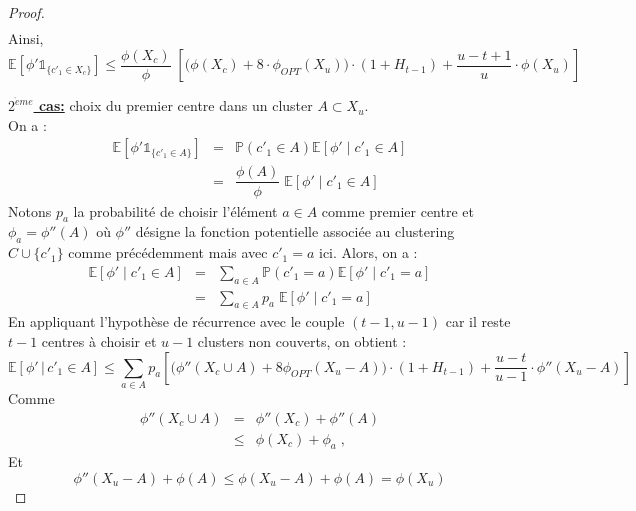 \documentclass[12pt,a4paper]{book}
\newcommand{\E}{\mathbb{E}}
\newcommand{\p}{\mathbb{P}}
\newcommand{\1}{\mathds{1}}
\begin{document}
\begin{proof}
\begin{eqnarray*}
		  \end{eqnarray*}
		  Ainsi,
		  $$
		  	\E\left[\phi' \1_{\{c'_1 \in X_c\}} \right] \leq \dfrac{\phi \left( X_c \right)}{\phi} \; \left[ \bigg( \phi \left( X_c \right) + 8 \cdot \phi_{OPT} \left( X_u \right) \bigg) \cdot \left( 1 + H_{t-1} \right) + \frac{u-t+1}{u} \cdot \phi \left( X_u \right) \right]
		  $$
		  \item \underline{\textbf{$2^{\grave{e}me}$ cas:}} choix du premier centre dans un cluster $A \subset X_u$.\\
		  On a :
		  \begin{eqnarray*}
		  	\E\left[\phi' \1_{\{c'_1 \in A\}} \right] &=& \p \left( c'_1 \in A \right)\E\left[\phi' \; | \; c'_1 \in A \right]\\
		  	&=&  \dfrac{\phi \left( A \right)}{\phi} \; \E\left[\phi' \; | \; c'_1 \in A \right]
		  \end{eqnarray*}
		  Notons $p_a$ la probabilité de choisir l'élément $a \in A$ comme premier centre et $\phi_a = \phi''(A)$ où $\phi''$ désigne la fonction potentielle associée au clustering $C \cup \{ c'_1 \}$ comme précédemment mais avec $c'_1=a$ ici. Alors, on a : 
		  \begin{eqnarray*}
		  	\E\left[\phi' \; | \; c'_1 \in A \right] &=& \sum_{a \in A} \p \left( c'_1=a \right) \E\left[\phi' \; | \; c'_1 = a \right] \\
		  	&=& \sum_{a \in A} p_a \; \E\left[\phi' \; | \; c'_1 = a \right] 
		  \end{eqnarray*}
		  En appliquant l'hypothèse de récurrence avec le couple $(t-1,u-1)$ car il reste $t-1$ centres à choisir et $u-1$ clusters non couverts, on obtient : 
		  $$
		  	\E\left[\phi' \, | \, c'_1 \in A \right] \leq \sum_{a \in A} p_a  \left[ \bigg( \phi'' \left( X_c \cup A \right) + 8 \phi_{OPT} \left( X_u - A \right) \bigg) \cdot \left( 1 + H_{t-1} \right) + \frac{u-t}{u-1} \cdot \phi'' \left( X_u - A \right) \right]
		  $$
		  Comme 
		  \begin{eqnarray*}
		  	\phi'' \left( X_c \cup A \right) &=& \phi'' \left( X_c \right) + \phi'' \left( A \right) \\
		  	& \leq & \phi \left( X_c \right) + \phi_a \; ,
		  \end{eqnarray*}
		  Et
		  $$
		  	\phi'' \left( X_u - A \right) + \phi \left( A \right) \leq \phi \left( X_u - A \right) + \phi \left( A \right) = \phi \left( X_u \right)
		  $$
		  

\end{proof}
\end{document}
